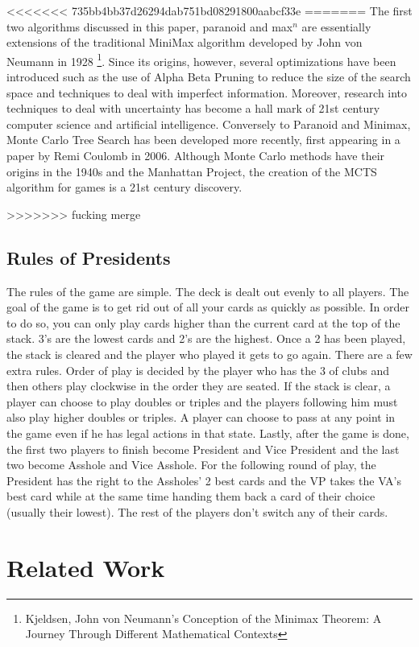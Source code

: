 \documentclass[11pt]{article}
\begin{document}
<<<<<<< 735bb4bb37d26294dab751bd08291800aabcf33e
=======
The first two algorithms discussed in this paper, paranoid and max$^n$ are essentially extensions of the traditional MiniMax algorithm developed by John von Neumann in 1928 \footnote{Kjeldsen, John von Neumann's Conception of the Minimax Theorem: A Journey Through Different Mathematical Contexts}. Since its origins, however, several optimizations have been introduced such as the use of Alpha Beta Pruning to reduce the size of the search space and techniques to deal with imperfect information. Moreover, research into techniques to deal with uncertainty has become a hall mark of 21st century computer science and artificial intelligence. Conversely to Paranoid and Minimax, Monte Carlo Tree Search has been developed more recently, first appearing in a paper by Remi Coulomb in 2006. Although Monte Carlo methods have their origins in the 1940s and the Manhattan Project, the creation of the MCTS algorithm for games is a 21st century discovery.


>>>>>>> fucking merge
\subsection{Rules of Presidents}

The rules of the game are simple. The deck is dealt out evenly to all players. The goal of the game is to get rid out of all your cards as quickly as possible. In order to do so, you can only play cards higher than the current card at the top of the stack. 3's are the lowest cards and 2's are the highest. Once a 2 has been played, the stack is cleared and the player who played it gets to go again. There are a few extra rules. Order of play is decided by the player who has the 3 of clubs and then others play clockwise in the order they are seated. If the stack is clear, a player can choose to play doubles or triples and the players following him must also play higher doubles or triples. A player can choose to pass at any point in the game even if he has legal actions in that state. Lastly, after the game is done, the first two players to finish become President and Vice President and the last two become Asshole and Vice Asshole. For the following round of play, the President has the right to the Assholes' 2 best cards and the VP takes the VA's best card while at the same time handing them back a card of their choice (usually their lowest). The rest of the players don't switch any of their cards.

\section{Related Work}
\end{document}
